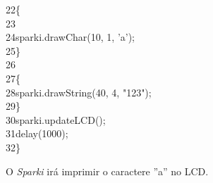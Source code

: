 \documentclass[conference]{IEEEtran}
\begin{document}
{{\color{cinza}22}\quad\quad\{\\
{\color{cinza}23}\quad\quad{}\\
{\color{cinza}24}\quad\quad\quad sparki.drawChar(10, 1, 'a');\\
{\color{cinza}25}\quad\quad\}\\
{\color{cinza}26}\quad{}\\
{\color{cinza}27}\quad\quad\{\\
{\color{cinza}28}\quad\quad\quad sparki.drawString(40, 4, "123");\\
{\color{cinza}29}\quad\quad\}\\
{\color{cinza}30}\quad\quad sparki.updateLCD();\\
{\color{cinza}31}\quad\quad delay(1000);\\
{\color{cinza}32}\quad\}}
\\
\par
O \textit{Sparki} irá imprimir o caractere ''a'' no LCD.
\end{document}
